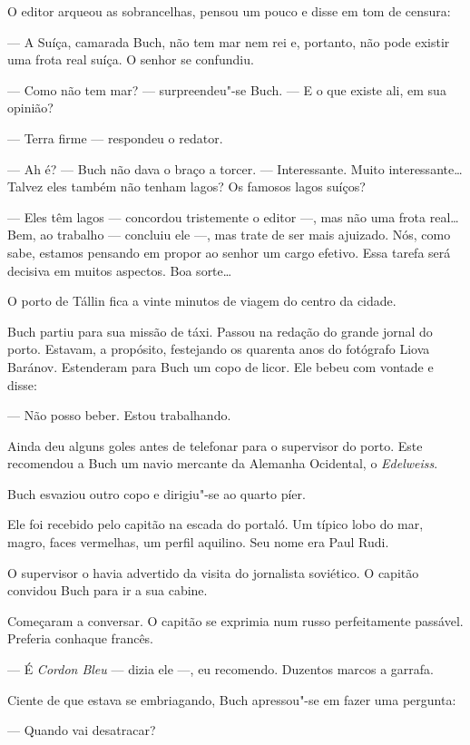 O editor arqueou as sobrancelhas, pensou um pouco e disse em tom de
censura:

--- A Suíça, camarada Buch, não tem mar nem rei e, portanto, não pode
existir uma frota real suíça. O senhor se confundiu.

--- Como não tem mar? --- surpreendeu"-se Buch. --- E o que existe ali,
em sua opinião?

--- Terra firme --- respondeu o redator.

--- Ah é? --- Buch não dava o braço a torcer. --- Interessante. Muito
interessante\ldots{} Talvez eles também não tenham lagos? Os famosos lagos
suíços?

--- Eles têm lagos --- concordou tristemente o editor ---, mas não uma
frota real\ldots{} Bem, ao trabalho --- concluiu ele ---, mas trate de ser
mais ajuizado. Nós, como sabe, estamos pensando em propor ao senhor um
cargo efetivo. Essa tarefa será decisiva em muitos aspectos. Boa sorte\ldots{}

\bigskip

O porto de Tállin fica a vinte minutos de viagem do centro da cidade.

Buch partiu para sua missão de táxi. Passou na redação do grande jornal
do porto. Estavam, a propósito, festejando os quarenta anos do fotógrafo
Liova Baránov. Estenderam para Buch um copo de licor. Ele bebeu com
vontade e disse:

--- Não posso beber. Estou trabalhando.

Ainda deu alguns goles antes de telefonar para o supervisor do porto.
Este recomendou a Buch um navio mercante da Alemanha Ocidental, o
\emph{Edelweiss}.

Buch esvaziou outro copo e dirigiu"-se ao quarto píer.

Ele foi recebido pelo capitão na escada do portaló. Um típico lobo do
mar, magro, faces vermelhas, um perfil aquilino. Seu nome era Paul Rudi.

O supervisor o havia advertido da visita do jornalista soviético. O
capitão convidou Buch para ir a sua cabine.

Começaram a conversar. O capitão se exprimia num russo perfeitamente
passável. Preferia conhaque francês.

--- É \emph{Cordon Bleu} --- dizia ele ---, eu recomendo. Duzentos
marcos a garrafa.

Ciente de que estava se embriagando, Buch apressou"-se em fazer uma
pergunta:

--- Quando vai desatracar?

